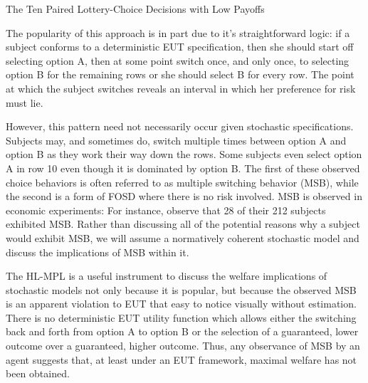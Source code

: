 \documentclass[../main.tex]{subfiles}
\begin{document}
\begin{table}[ht]
	\centering
	\captionsetup{justification=centering}
	\caption{The Ten Paired Lottery-Choice Decisions with Low Payoffs \newline \textcite[1645]{Holt2002} }
	\label{tb:HL-MPL}
	\begin{adjustbox}{width=1\textwidth}
	\end{adjustbox}
\end{table}

The popularity of this approach is in part due to it's straightforward logic:
if a subject conforms to a deterministic EUT specification, then she should start off selecting option A, then at some point switch once, and only once, to selecting option B for the remaining rows or she should select B for every row.
The point at which the subject switches reveals an interval in which her preference for risk must lie.

However, this pattern need not necessarily occur given stochastic specifications.
Subjects may, and sometimes do, switch multiple times between option A and option B as they work their way down the rows.
Some subjects even select option A in row 10 even though it is dominated by option B.
The first of these observed choice behaviors is often referred to as multiple switching behavior (MSB), while the second is a form of FOSD where there is no risk involved.
MSB is observed in economic experiments: For instance, \textcite[1647]{Holt2002} observe that 28 of their 212 subjects exhibited MSB.
Rather than discussing all of the potential reasons why a subject would exhibit MSB, we will assume a normatively coherent stochastic model and discuss the implications of MSB within it.

The HL-MPL is a useful instrument to discuss the welfare implications of stochastic models not only because it is popular, but because the observed MSB is an apparent violation to EUT that easy to notice visually without estimation.
There is no deterministic EUT utility function which allows either the switching back and forth from option A to option B or the selection of a guaranteed, lower outcome over a guaranteed, higher outcome.
Thus, any observance of MSB by an agent suggests that, at least under an EUT framework, maximal welfare has not been obtained.
\end{document}
